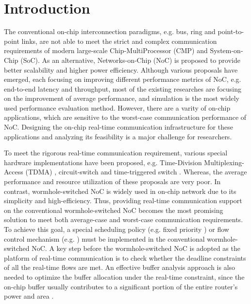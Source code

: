 \documentclass[preprint]{elsarticle}
\begin{document}
\linenumbers

\section{Introduction}
The conventional on-chip interconnection paradigms, e.g. bus, ring and point-to-point links, are not able to meet the strict and complex communication requirements of modern large-scale Chip-MultiProcessor (CMP) and System-on-Chip (SoC). As an alternative, Networks-on-Chip (NoC) is proposed to provide better scalability and higher power efficiency. Although various proposals have emerged, each focusing on improving different performance metrics of NoC, e.g. end-to-end latency and throughput, most of the existing researches are focusing on the improvement of average performance, and simulation is the most widely used performance evaluation method. However, there are a varity of on-chip applications, which are sensitive to the worst-case communication performance of NoC. Designing the on-chip real-time communication infrastructure for these applications and analyzing its feasibility is a major challenge for researchers.

To meet the rigorous real-time communication requirement, various special hardware implementations have been proposed, e.g. Time-Division Multiplexing-Access (TDMA) \cite{GoDR05}, circuit-switch \cite{6628254} and time-triggered switch \cite{4617280}. Whereas, the average performance and resource utilization of these proposals are very poor. In contrast, wormhole-switched NoC is widely used in on-chip network due to its simplicity and high-efficiency. Thus, providing real-time communication support on the conventional wormhole-switched NoC becomes the most promising solution to meet both average-case and worst-case communication requirements. To achieve this goal, a special scheduling policy (e.g. fixed priority \cite{Shi:2008:RCA:1397757.1397996,708526,627905}) or flow control mechanism (e.g. \cite{Li199649,707545}) must be implemented in the conventional wormhole-switched NoC. A key step before the wormhole-switched NoC is adopted as the platform of real-time communication is to check whether the deadline constraints of all the real-time flows are met. An effective buffer analysis approach is also needed to optimize the buffer allocation under the real-time constraint, since the on-chip buffer usually contributes to a significant portion of the entire router's power and area \cite{pkundu,5507566}.
\end{document}
